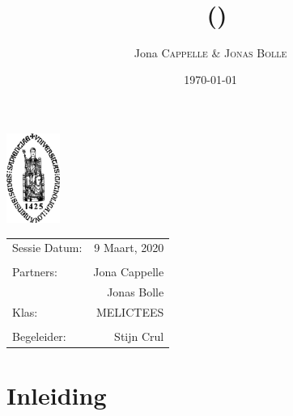 \documentclass[11pt,twoside,a4paper]{article}
\title{\maintitle \\ \course \\{\small\ (\coursenumber)}} %
\author{Jona \textsc{Cappelle} \& \textsc{Jonas Bolle}} %
\date{\today} %
\newcommand{\class}{MELICTEES}
\begin{document}
\sloppy %
\begin{titlepage}
\maketitle %

\vfill
\begin{center}
\includegraphics[width=0.13\textwidth]{logo_kuleuven.png} %
\end{center}
\vfill
\vfill
\vfill

\begin{center}
\begin{tabular}{l r}
Sessie Datum: & 9 Maart, 2020 \\ %
\\
Partners: &  Jona Cappelle\\ %
&  Jonas Bolle\\
Klas: & \class \\
\\
Begeleider: &  Stijn Crul%
\end{tabular}
\end{center}
\vfill
\vfill
\end{titlepage}
\clearpage
\newpage\null\thispagestyle{empty}\newpage %



\restoregeometry%

\tableofcontents
\listoffigures
\listoftables
\clearpage

\section{Inleiding}
\end{document}

